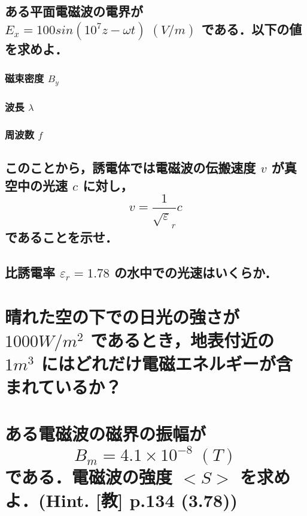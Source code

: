 \documentclass[a4paper, 11pt]{bxjsarticle}
\begin{document}
\begin{samepage}
\section{}
\subsection{ある平面電磁波の電界が \(E_x=100sin(10^7 z - \omega t)\;\si{(V/m)}\) である．以下の値を求めよ．}
\subsubsection{磁束密度 \(B_y\)}
\vspace*{7.5em}
\subsubsection{波長 \(\lambda\)}
\vspace*{7.5em}
\subsubsection{周波数 \(f\)}
\vspace*{7.5em}

\subsection{このことから，誘電体では電磁波の伝搬速度 \(v\) が真空中の光速 \(c\) に対し，\[v=\frac{1}{\sqrt \varepsilon_r} c\]であることを示せ．}
\vspace*{10em}
\subsection{比誘電率 \(\varepsilon_r = 1.78\) の水中での光速はいくらか．}
\end{samepage}
\newpage

\begin{samepage}
\section{晴れた空の下での日光の強さが \(1000\si{W/m^2}\) であるとき，地表付近の \(1\si{m^3}\) にはどれだけ電磁エネルギーが含まれているか？}
\vspace*{25em}
\section{ある電磁波の磁界の振幅が\[B_m = 4.1\times 10^{-8}\;\si{(T)}\]である．電磁波の強度 \(<S>\) を求めよ．(Hint. [教] p.134 (3.78))}
\end{samepage}
\end{document}
